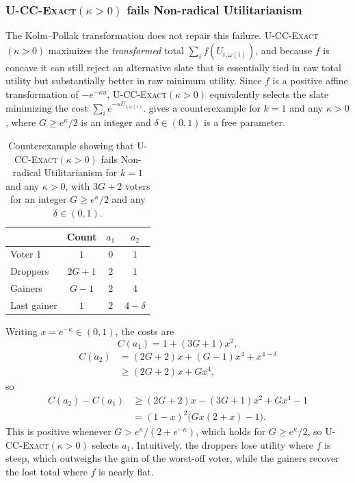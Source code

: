 \documentclass[letterpaper]{article} %
\newcommand{\ExactP}{\textsc{U-CC-Exact}$(\kappa>0)$}
\begin{document}
\subsubsection{\ExactP{} fails Non-radical Utilitarianism}
\label{app:exactp-nru}
The Kolm--Pollak transformation does not repair this failure.
\ExactP{} maximizes the \emph{transformed} total $\sum_i f(U_{i,\omega(i)})$, and because $f$ is concave it can still reject an alternative slate that is essentially tied in raw total utility but substantially better in raw minimum utility.
Since $f$ is a positive affine transformation of $-e^{-\kappa u}$, \ExactP{} equivalently selects the slate minimizing the cost $\sum_i e^{-\kappa U_{i,\omega(i)}}$.
 gives a counterexample for $k=1$ and any $\kappa>0$, where $G\ge e^{\kappa}/2$ is an integer and $\delta\in(0,1)$ is a free parameter.
\begin{table}[t]
\centering
\begin{tabular}{l|c|cc}
\hline
 & Count & $a_1$ & $a_2$ \\
\hline
Voter 1 & $1$ & $0$ & $1$ \\
Droppers & $2G+1$ & $2$ & $1$ \\
Gainers & $G-1$ & $2$ & $4$ \\
Last gainer & $1$ & $2$ & $4-\delta$ \\
\hline
\end{tabular}
\caption{Counterexample showing that \ExactP{} fails Non-radical Utilitarianism for \(k=1\) and any \(\kappa>0\), with \(3G+2\) voters for an integer \(G\ge e^{\kappa}/2\) and any \(\delta\in(0,1)\).}
\label{tab:failure-exactp-nru}
\end{table}
Writing \(x=e^{-\kappa}\in(0,1)\), the costs are
\[
C(a_1)=1+(3G+1)x^2,
\]
\[
\begin{aligned}
C(a_2)&=(2G+2)x+(G-1)x^4+x^{4-\delta}\\
&\ge(2G+2)x+Gx^4,
\end{aligned}
\]
so
\[
\begin{aligned}
C(a_2)-C(a_1)&\ge(2G+2)x-(3G+1)x^2+Gx^4-1\\
&=(1-x)^2\bigl(Gx(2+x)-1\bigr).
\end{aligned}
\]
This is positive whenever \(G>e^{\kappa}/(2+e^{-\kappa})\), which holds for \(G\ge e^{\kappa}/2\), so \ExactP{} selects \(a_1\).
Intuitively, the droppers lose utility where \(f\) is steep, which outweighs the gain of the worst-off voter, while the gainers recover the lost total where \(f\) is nearly flat.
\end{document}
